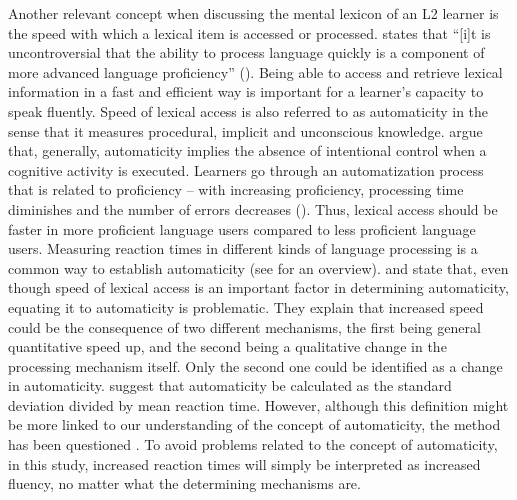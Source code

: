 \documentclass[output=paper,colorlinks,citecolor=brown,nonflat]{langsci/langscibook}
\begin{document}
Another relevant concept when discussing the mental lexicon of an L2 learner is the speed with which a lexical item is accessed or processed. \citeauthor{Pellicer-Sánchez2015} states that “[i]t is uncontroversial that the ability to process language quickly is a component of more advanced language proficiency” (\citeyear[127]{Pellicer-Sánchez2015}). Being able to access and retrieve lexical information in a fast and efficient way is important for a learner’s capacity to speak fluently. Speed of lexical access is also referred to as automaticity \citep{Schmitt2010} in the sense that it measures procedural, implicit and unconscious knowledge. \citet[371]{SegalowitzHulstijn2005} argue that, generally, automaticity implies the absence of intentional control when a cognitive activity is executed. Learners go through an automatization process that is related to proficiency – with increasing proficiency, processing time diminishes and the number of errors decreases (\citealt{DeKeyser2007}). Thus, lexical access should be faster in more proficient language users compared to less proficient language users. Measuring reaction times in different kinds of language processing is a common way to establish automaticity (see \citealt{SegalowitzHulstijn2005} for an overview). \citet{SegalowitzSegalowitz1993} and \citet{SegalowitzHulstijn2005} state that, even though speed of lexical access is an important factor in determining automaticity, equating it to automaticity is problematic. They explain that increased speed could be the consequence of two different mechanisms, the first being general quantitative speed up, and the second being a qualitative change in the processing mechanism itself. Only the second one could be identified as a change in automaticity. \citet{SegalowitzSegalowitz1993} suggest that automaticity be calculated as the standard deviation divided by mean reaction time. However, although this definition might be more linked to our understanding of the concept of automaticity, the method has been questioned \citep{HulstijnEtAl2009}. To avoid problems related to the concept of automaticity, in this study, increased reaction times will simply be interpreted as increased fluency, no matter what the determining mechanisms are.
\end{document}
